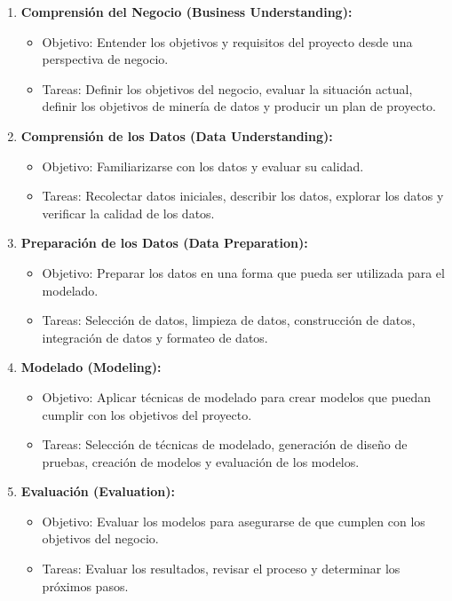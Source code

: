 \documentclass{article}
\begin{document}
\begin{enumerate}
\item \textbf{Comprensión del Negocio (Business Understanding):}

\begin{itemize}
\item Objetivo: Entender los objetivos y requisitos del proyecto desde una perspectiva de negocio.
\item Tareas: Definir los objetivos del negocio, evaluar la situación actual, definir los objetivos de minería de datos y producir un plan de proyecto.
\end{itemize}

\item \textbf{Comprensión de los Datos (Data Understanding):}

\begin{itemize}
\item Objetivo: Familiarizarse con los datos y evaluar su calidad.
\item Tareas: Recolectar datos iniciales, describir los datos, explorar los datos y verificar la calidad de los datos.
\end{itemize}

\item \textbf{Preparación de los Datos (Data Preparation):}

\begin{itemize}
\item Objetivo: Preparar los datos en una forma que pueda ser utilizada para el modelado.
\item Tareas: Selección de datos, limpieza de datos, construcción de datos, integración de datos y formateo de datos.
\end{itemize}

\item \textbf{Modelado (Modeling):}

\begin{itemize}
\item Objetivo: Aplicar técnicas de modelado para crear modelos que puedan cumplir con los objetivos del proyecto.
\item Tareas: Selección de técnicas de modelado, generación de diseño de pruebas, creación de modelos y evaluación de los modelos.
\end{itemize}

\item \textbf{Evaluación (Evaluation):}

\begin{itemize}
\item Objetivo: Evaluar los modelos para asegurarse de que cumplen con los objetivos del negocio.
\item Tareas: Evaluar los resultados, revisar el proceso y determinar los próximos pasos.
\end{itemize}


\end{enumerate}
\end{document}
